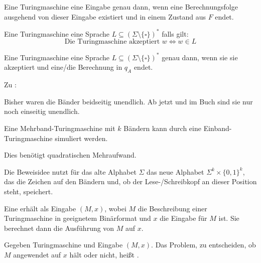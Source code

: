Eine Turingmaschine  eine Eingabe genau dann, wenn eine Berechnungsfolge ausgehend von dieser Eingabe existiert und in einem Zustand aus $F$ endet.

Eine Turingmaschine  eine Sprache $L \subseteq \left( \Sigma \setminus \{\square\} \right)^\ast$ falls gilt: 
$$ \text{Die Turingmaschine akzeptiert } w \Leftrightarrow w \in L $$

Eine Turingmaschine  eine Sprache $L \subseteq \left( \Sigma \setminus \{\square\} \right)^\ast$ genau dann, wenn sie sie akzeptiert und eine/die Berechnung in $q_A$ endet.







Zu :

Bisher waren die Bänder beidseitig unendlich. Ab jetzt und im Buch sind sie nur noch einseitig unendlich.



\begin{satz}
    Eine Mehrband-Turingmaschine mit $k$ Bändern kann durch eine Einband-Turingmaschine simuliert werden.

    Dies benötigt quadratischen Mehraufwand.
\end{satz}

\begin{beweis}
    Die Beweisidee nutzt für das alte Alphabet $\Sigma$ das neue Alphabet $\Sigma^k \times \{0,1\}^k$, das die Zeichen auf den Bändern und, ob der Lese-/Schreibkopf an dieser Position steht, speichert.
\end{beweis}



\begin{definition}
    Eine  erhält als Eingabe $(M, x)$, wobei $M$ die Beschreibung einer Turingmaschine in geeignetem Binärformat und $x$ die Eingabe für $M$ ist.
    Sie berechnet dann die Ausführung von $M$ auf $x$.
\end{definition}





\begin{definition}
    Gegeben Turingmaschine und Eingabe $(M, x)$. Das Problem, zu entscheiden, ob $M$ angewendet auf $x$ hält oder nicht, heißt .
\end{definition}

